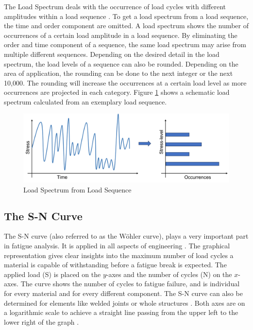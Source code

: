 The Load Spectrum deals with the occurrence of load cycles with different amplitudes within a load sequence \cite{Facchinetti}. To get a load spectrum from a load sequence, the time and order component are omitted. A load spectrum shows the number of occurrences of a certain load amplitude in a load sequence.
By eliminating the order and time component of a sequence, the same load spectrum may arise from multiple different sequences. Depending on the desired detail in the load spectrum, the load levels of a sequence can also be rounded. Depending on the area of application, the rounding can be done to the next integer or the next 10,000. The rounding will increase the occurrences at a certain load level as more occurrences are projected in each category. 
Figure \ref{fig:LS} shows a schematic load spectrum calculated from an exemplary load sequence.
  

\begin{figure}[H]
	\centering
	\includegraphics[width=0.9\linewidth]{IMGs/Spectrum.png}
	\caption{Load Spectrum from Load Sequence}
	\label{fig:LS}
\end{figure}

\subsection{The S-N Curve}\label{sn}
The S-N curve (also referred to as the Wöhler curve), plays a very important part in fatigue analysis. It is applied in all aspects of engineering \cite{Burhan,Pungo}. 
The graphical representation gives clear insights into the maximum number of load cycles a material is capable of withstanding before a fatigue break is expected.
The applied load (S) is placed on the \(y\)-axes and the number of cycles (N) on the \(x\)-axes. The curve shows the number of cycles to fatigue failure, and is individual for every material and for every different component.
The S-N curve can also be determined for elements like welded joints or whole structures \cite{Baptista, Dong}.
Both axes are on a logarithmic scale to achieve a straight line passing from the upper left to the lower right of the graph \cite{Little}.

